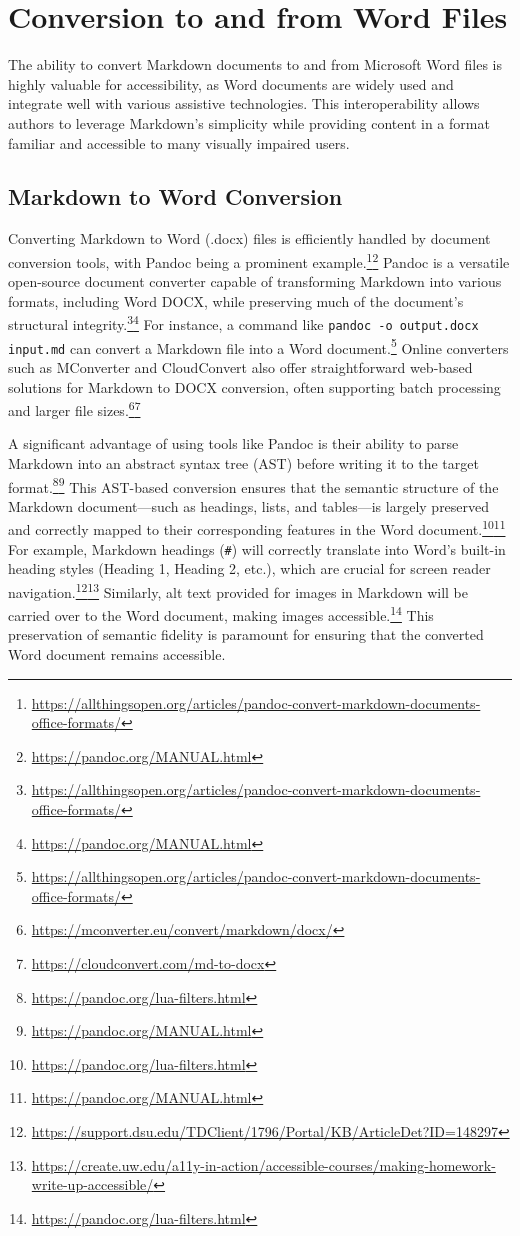 \section{Conversion to and from Word Files}

The ability to convert Markdown documents to and from Microsoft Word files is highly valuable for accessibility, as Word documents are widely used and integrate well with various assistive technologies. This interoperability allows authors to leverage Markdown's simplicity while providing content in a format familiar and accessible to many visually impaired users.

\subsection{Markdown to Word Conversion}
Converting Markdown to Word (.docx) files is efficiently handled by document conversion tools, with Pandoc being a prominent example.\footnote{\url{https://allthingsopen.org/articles/pandoc-convert-markdown-documents-office-formats/}}\footnote{\url{https://pandoc.org/MANUAL.html}} Pandoc is a versatile open-source document converter capable of transforming Markdown into various formats, including Word DOCX, while preserving much of the document's structural integrity.\footnote{\url{https://allthingsopen.org/articles/pandoc-convert-markdown-documents-office-formats/}}\footnote{\url{https://pandoc.org/MANUAL.html}} For instance, a command like \texttt{pandoc -o output.docx input.md} can convert a Markdown file into a Word document.\footnote{\url{https://allthingsopen.org/articles/pandoc-convert-markdown-documents-office-formats/}} Online converters such as MConverter and CloudConvert also offer straightforward web-based solutions for Markdown to DOCX conversion, often supporting batch processing and larger file sizes.\footnote{\url{https://mconverter.eu/convert/markdown/docx/}}\footnote{\url{https://cloudconvert.com/md-to-docx}}

A significant advantage of using tools like Pandoc is their ability to parse Markdown into an abstract syntax tree (AST) before writing it to the target format.\footnote{\url{https://pandoc.org/lua-filters.html}}\footnote{\url{https://pandoc.org/MANUAL.html}} This AST-based conversion ensures that the semantic structure of the Markdown document---such as headings, lists, and tables---is largely preserved and correctly mapped to their corresponding features in the Word document.\footnote{\url{https://pandoc.org/lua-filters.html}}\footnote{\url{https://pandoc.org/MANUAL.html}} For example, Markdown headings (\texttt{\#}) will correctly translate into Word's built-in heading styles (Heading 1, Heading 2, etc.), which are crucial for screen reader navigation.\footnote{\url{https://support.dsu.edu/TDClient/1796/Portal/KB/ArticleDet?ID=148297}}\footnote{\url{https://create.uw.edu/a11y-in-action/accessible-courses/making-homework-write-up-accessible/}} Similarly, alt text provided for images in Markdown will be carried over to the Word document, making images accessible.\footnote{\url{https://pandoc.org/lua-filters.html}} This preservation of semantic fidelity is paramount for ensuring that the converted Word document remains accessible.

